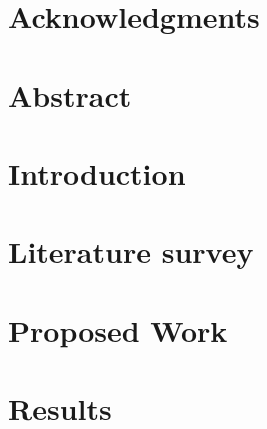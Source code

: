 \documentclass[11pt]{book}
\renewcommand{\baselinestretch}{1.2}
\begin{document}






\thispagestyle{empty}
\renewcommand{\thesisdedication}{{\large Copyright \copyright~~Suman Saurabh, Subodh Rawani, Sachin Mittal, Abhishek Kumar  2015\\}{\large All Rights Reserved\\}}
\thesisdedicationpage



\newpage
\thispagestyle{empty}
\renewcommand{\thesisdedication}{\large To People who are struck in Traffic}
\thesisdedicationpage


\chapter*{Acknowledgments}
\label{ch:ack}


\chapter*{Abstract}
\label{ch:ack}



\tableofcontents
\listoffigures
\listoftables

\chapter{Introduction}
\label{ch:intro}
  

\chapter{Literature survey}
\label{ch:literature}


\chapter{Proposed Work}
\label{ch:new}


\chapter{Results}
\label{ch:result}

\end{document}
